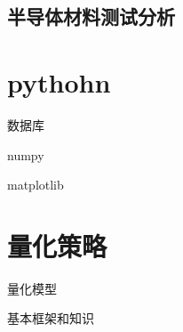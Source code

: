 \subsection{半导体材料测试分析}


\section{pythohn}
数据库

numpy

matplotlib

\section{量化策略}
量化模型

基本框架和知识




%
